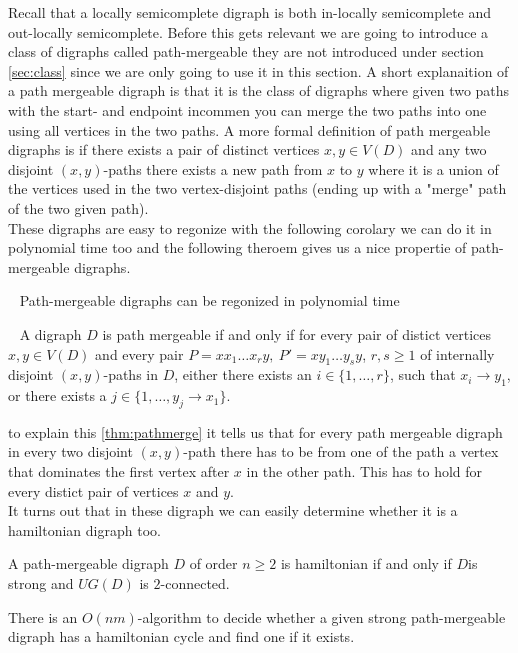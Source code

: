 Recall that a locally semicomplete digraph is both in-locally semicomplete and out-locally semicomplete. 
Before this gets relevant we are going to introduce a class of digraphs called path-mergeable they are not introduced under section \autoref{sec:class} since we are only going to use it in this section.
A short explanaition of a path mergeable digraph is that it is the class of digraphs where given two paths with the start- and endpoint incommen you can merge the two paths into one using all vertices in the two paths. 
A more formal definition of path mergeable digraphs is if there exists a pair of distinct vertices $x,y\in V(D)$ and any two disjoint $(x,y)$-paths there exists a new path from $x$ to $y$ where it is a union of the vertices used in the two vertex-disjoint paths (ending up with a "merge" path of the two given path).\\
These digraphs are easy to regonize with the following corolary we can do it in polynomial time too and the following theroem gives us a nice propertie of path-mergeable digraphs.
\begin{corollary}~\cite{banggutin}
    Path-mergeable digraphs can be regonized in polynomial time
\end{corollary}
\begin{thm}~\cite{banggutin}
    A digraph $D$ is path mergeable if and only if for every pair of distict vertices $x,y\in V(D)$ and every pair $P=xx_1\dots x_ry,\ P'=xy_1\dots y_sy$, $r,s\geq 1$ of internally disjoint $(x,y)$-paths in $D$, either there exists an $i\in \lbrace 1,\dots ,r\rbrace$, such that $x_i\rightarrow y_1$, or there exists a $j\in \lbrace 1,\dots, y_j\rightarrow x_1\rbrace$.
    \label{thm:pathmerge}
\end{thm}
to explain this \autoref{thm:pathmerge} it tells us that for every path mergeable digraph in every two disjoint $(x,y)$-path there has to be from one of the path a vertex that dominates the first vertex after $x$ in the other path. This has to hold for every distict pair of vertices $x$ and $y$. \\
It turns out that in these digraph we can easily determine whether it is a hamiltonian digraph too.
\begin{thm}
    A path-mergeable digraph $D$ of order $n\geq 2$ is hamiltonian if and only if $D$is strong and $UG(D)$ is $2$-connected.
    \label{thm:pathham}
\end{thm}
\begin{corollary}
    There is an $O(nm)$-algorithm to decide whether a given strong path-mergeable digraph has a hamiltonian cycle and find one if it exists.
    \label{cor:polypath}
\end{corollary}
